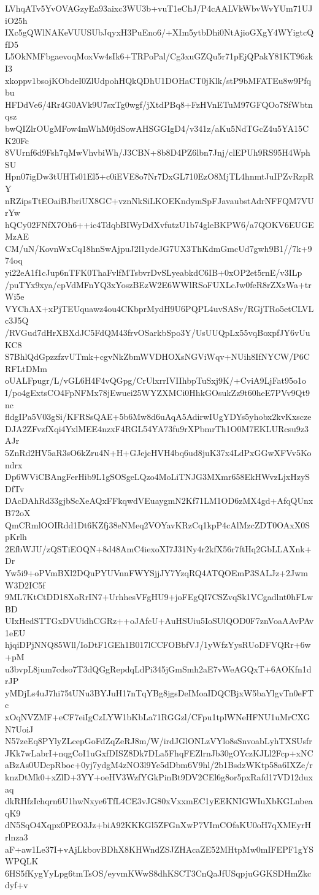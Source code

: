 LVhqATv5YvOVAGzyEa93aixc3WU3b+vuT1eChJ/P4cAALVkWbvWvYUm71UJiO25h
IXc5gQWlNAKeVUUSUbJqyxH3PuEno6/+XIm5ytbDhi0NtAjioGXgY4WYigtcQfD5
L5OkNMFbgaevoqMoxVw4sIk6+TRPoPal/Cg3xuGZQu5r71pEjQPakY81KT96zkI3
xkoppv1bsojKObdeI0ZlUdpohHQkQDhU1DOHaCT0jKlk/stP9bMFATEu8w9Pfqbu
HFDdVe6/4Rr4G0AVk9U7sxTg0wgf/jXtdPBq8+FzHVnETuM97GFQOo7SfWbtnqsz
bwQIZlrOUgMFow4mWhM0jdSowAHSGGIgD4/v341z/aKu5NdTGcZ4u5YA15CK20Fc
8VUrnf6d9Fsh7qMwVhvbiWh/J3CBN+8b8D4PZ6lbn7Jnj/clEPUh9RS95H4WphSU
Hpn07igDw3tUHTs01El5+c0iEVE8o7Nr7DxGL710EzO8MjTL4hnmtJuIPZvRzpRY
nRZipsTtEOaiBJbriUX8GC+vznNkSiLKOEKndymSpFJavaubstAdrNFFQM7VUrYw
hQCy02FNfX7Oh6++ic4TdqbBIWyDdXvfutzU1b74gleBKPW6/a7QOKV6EUGEMzAE
CM/uN/KovnWxCq18hnSwAjpuJ2l1ydeJG7UX3ThKdmGmcUd7gwh9B1//7k+974oq
yi22eA1f1cJup6nTFK0ThaFvlfMTsbvrDvSLyeabkdC6IB+0xOP2et5rnE/v3ILp
/puTYx9xya/cpVdMFnYQ3xYoszBEzW2E6WWlRSoFUXLcJw0feR8rZXzWa+trWi5e
VYChAX+xPjTEUquawz4ou4CKbprMydH9U6PQPL4uvSASv/RGjTRo5etCLVLc3J5Q
/RVGud7dHrXBXdJC5FdQM43frvOSarkbSpo3Y/UsUUQpLx55vqBoxpfJY6vUuKC8
S7BhlQdGpzzfzvUTmk+cgvNkZbmWVDHOXsNGViWqv+NUih8IfNYCW/P6CRFLtDMm
oUALFpugr/L/vGL6H4F4vQGpg/CrUlxrrIVIIhbpTuSxj9K/+CviA9LjFat95o1o
I/po4gExtsCO4FpNFMx78jEwuei25WYZXMCi0HhkGOsukZz9t60heE7PVv9Qt9nc
fldgIPa5V03gSi/KFRSsQAE+5b6Mw8d6uAqA5AdirwIUgYDYs5yhobx2kvKxscze
DJA2ZFvzfXqi4YxlMEE4nzxF4RGL54YA73fu9rXPbmrTh1O0M7EKLURcsu9z3AJr
5ZnRd2HV5aR3sO6kZru4N+H+GJejcHVH4bq6ud8juK37x4LdPxGGwXFVv5Kondrx
Dp6WViCBAngFerHib9L1gSOSgeLQzo4MoLiTNJG3MXmr658EkHWvzLjxHzySDfTv
DAcDAhRd33gjbScXeAQxFFkqwdVEuaygmN2Kf71LM1OD6zMX4gd+AfqQUnxB72oX
QmCRmlOOIRdd1Dt6KZfj38eNMeq2VOYavKRzCq1kpP4cAlMzcZDT0OAxX0SpKrlh
2EfbWJU/zQSTiEOQN+8d48AmC4iexoXI7J31Ny4r2kfX56r7ftHq2GbLLAXnk+Dr
Yw5i9+oPVmBXl2DQuPYUVnnFWYSjjJY7YzqRQ4ATQOEmP3SALJz+2JwmW3D2IC5f
9ML7KtCtDD18XoRrIN7+UrhhesVFgHU9+joFEgQI7CSZvqSk1VCgadlnt0hFLwBD
UIxHedSTTGxDVUidhCGRz++oJAfcU+AuHSUiu5IoSUlQOD0F7znVoaAAvPAv1eEU
hjqiDPjNNQ85Wll/IoDtF1GEh1B017lCCFOBbfVJ/1yWfzYysRUoDFVQRr+6w+pM
u3bvpL8jum7cdso7T3dQGgRepdqLdPi345jGmSmh2aE7vWeAGQxT+6AOKfn1drJP
yMDjLs4uJ7hi75tUNu3BYJuH17nTqYBg8jgsDeIMoaIDQCBjxW5baYlgvTn0eFTc
xOqNVZMF+eCF7eiIgCzLYW1bKbLa71RGGzl/CFpu1tplWNeHFNU1uMrCXGN7UoiJ
N57zeEq8PYlyZLcepGoFdZqZeRJ8m/W/irdJGlONLzVYlo8sSnvoabLyhTXSUsfr
JKk7wLabrI+nqgCoI1uGxfDISZ8Dk7DLa5FhqFEZlrnJb30gOYczKJLl2Fcp+xNC
aBzAs0UDcpRboc+0yj7ydgM4zNO3l9Ye5dDbm6V9hl/2b1BsdzWKtp58a6IXZe/r
knzDtMk0+xZlD+3YY+oeHV3WzfYGkPinBt9DV2CEl6g8or5pxRafd17VD12duxaq
dkRHfzIchqrn6U1hwNxye6TfL4CE3vJG80xVxxmEC1yEEKNIGWIuXbKGLnbeaqK9
dN5SqO4Xqpx0PEO3Jz+biA92KKKGl5ZFGnXwP7VImCOfaKU0oH7qXMEyrHrlnza3
aF+aw1Le37I+vAjLkbovBDhX8KHWndZSJZHAcaZE52MHtpMw0mIFEPF1gYSWPQLK
6HS5fKygYyLpg6tmTsOS/eyvmKWwS8dhKSCT3CnQaJfUSqpjuGGKSDHmZkcdyf+v
